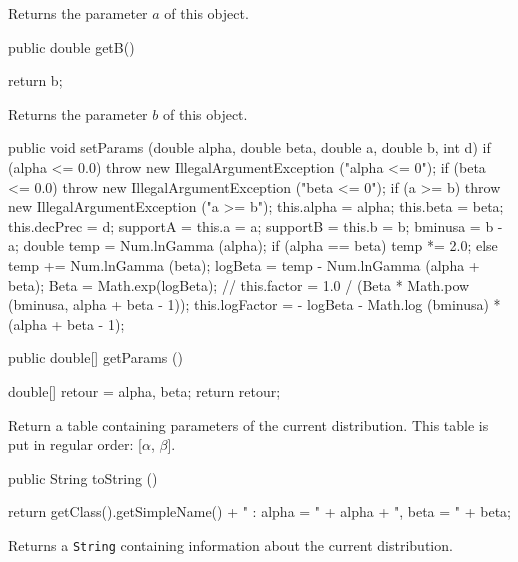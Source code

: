   \begin{tabb} Returns the parameter $a$ of this object.
  \end{tabb}
\begin{code}

   public double getB()\begin{hide} {
      return b;
   }\end{hide}
\end{code}
\begin{tabb} Returns the parameter $b$ of this object.
\end{tabb}
\begin{code}\begin{hide}
    public void setParams (double alpha, double beta,
                           double a, double b, int d) {
      if (alpha <= 0.0)
         throw new IllegalArgumentException ("alpha <= 0");
      if (beta <= 0.0)
         throw new IllegalArgumentException ("beta <= 0");
      if (a >= b)
         throw new IllegalArgumentException ("a >= b");
      this.alpha = alpha;
      this.beta = beta;
      this.decPrec = d;
      supportA = this.a = a;
      supportB = this.b = b;
      bminusa = b - a;
      double temp = Num.lnGamma (alpha);
      if (alpha == beta)
         temp *= 2.0;
      else
         temp += Num.lnGamma (beta);
      logBeta = temp - Num.lnGamma (alpha + beta);
      Beta = Math.exp(logBeta);
//      this.factor = 1.0 / (Beta * Math.pow (bminusa, alpha + beta - 1));
      this.logFactor = - logBeta - Math.log (bminusa) * (alpha + beta - 1);
    } \end{hide}
\end{code}
\begin{tabb}
\end{tabb}
\begin{code}

   public double[] getParams ()\begin{hide} {
      double[] retour = {alpha, beta};
      return retour;
   }\end{hide}
\end{code}
\begin{tabb}
   Return a table containing parameters of the current distribution.
   This table is put in regular order: [$\alpha$, $\beta$].
\end{tabb}
\begin{hide}\begin{code}

   public String toString ()\begin{hide} {
      return getClass().getSimpleName() + " : alpha = " + alpha + ", beta = " + beta;
   }\end{hide}
\end{code}
\begin{tabb}
   Returns a \texttt{String} containing information about the current distribution.
\end{tabb}\end{hide}
\begin{code}\begin{hide}
}\end{hide}
\end{code}
